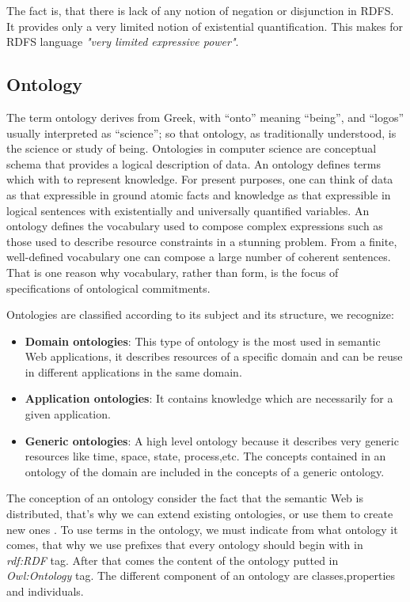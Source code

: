 
\noindent The fact is, that there is lack of any notion of negation or disjunction in RDFS. It provides only a very limited notion of existential quantification. This makes for RDFS language \textit{"very limited expressive power"}.

\subsection{Ontology}
The term ontology \cite{ontonew} derives from Greek, with “onto” meaning “being”, and “logos” usually interpreted as “science”; so that ontology, as traditionally understood, is the science or study of being.
Ontologies in computer science are conceptual schema that provides a logical description of data. An ontology defines terms which with to represent knowledge. For present purposes, one can think of data as that expressible in ground atomic facts and knowledge as that expressible in logical sentences with existentially and universally quantified variables. An ontology defines the vocabulary used to compose complex expressions such as those used to describe resource constraints in a stunning  problem. From a finite, well-defined vocabulary one can compose a large number of coherent sentences. That is one reason why vocabulary, rather than form, is the focus of specifications of ontological commitments. 

Ontologies are classified according to its subject and its structure, we recognize:\begin{itemize}  
\item \textbf{Domain ontologies}: This type of ontology is the most used in semantic Web applications, it describes resources of a specific domain and can be reuse in different applications in the same domain.

\item\textbf{Application ontologies}: It contains knowledge which are necessarily for a given application.
\item \textbf{Generic ontologies}: A high level ontology because it describes very generic resources like time, space, state, process,etc.
The concepts contained in an ontology of the domain are included in the concepts of a generic ontology.
\end{itemize} 
The conception of an ontology consider the fact that the semantic Web is distributed, that's why we can extend existing ontologies, or use them to create new ones .
To use terms in the ontology, we must indicate from what ontology it comes, that why we use prefixes that every ontology should  begin with in \textit{rdf:RDF} tag.
After that comes the content of the ontology putted in \textit{Owl:Ontology} tag.
The different component of an ontology are classes,properties and individuals.

